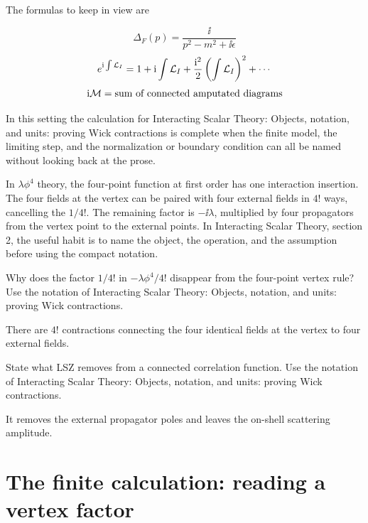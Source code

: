 The formulas to keep in view are

\[
  \Delta_F(p)=\frac{\ii}{p^2-m^2+\ii\epsilon}
\]
\[
  e^{\mathrm i\int\mathcal L_I}=1+\mathrm i\int\mathcal L_I+\frac{\mathrm i^2}{2}\left(\int\mathcal L_I\right)^2+\cdots
\]
\[
  \mathrm i\mathcal M=\hbox{sum of connected amputated diagrams}
\]

In this setting the calculation for Interacting Scalar Theory: Objects, notation, and units: proving Wick contractions is complete when the finite model, the limiting step, and the normalization or boundary condition can all be named without looking back at the prose.




\begin{example}
In \(\lambda\phi^4\) theory, the four-point function at first order has one interaction insertion.  The four fields at the vertex can be paired with four external fields in \(4!\) ways, cancelling the \(1/4!\).  The remaining factor is \(-\ii\lambda\), multiplied by four propagators from the vertex point to the external points.  In Interacting Scalar Theory, section 2, the useful habit is to name the object, the operation, and the assumption before using the compact notation.
\end{example}



\begin{exercise}
Why does the factor \(1/4!\) in \(-\lambda\phi^4/4!\) disappear from the four-point vertex rule?  Use the notation of Interacting Scalar Theory: Objects, notation, and units: proving Wick contractions.
\begin{answer}
There are \(4!\) contractions connecting the four identical fields at the vertex to four external fields.
\end{answer}
\end{exercise}

\begin{exercise}
State what LSZ removes from a connected correlation function.  Use the notation of Interacting Scalar Theory: Objects, notation, and units: proving Wick contractions.
\begin{answer}
It removes the external propagator poles and leaves the on-shell scattering amplitude.
\end{answer}
\end{exercise}



\section{The finite calculation: reading a vertex factor}

